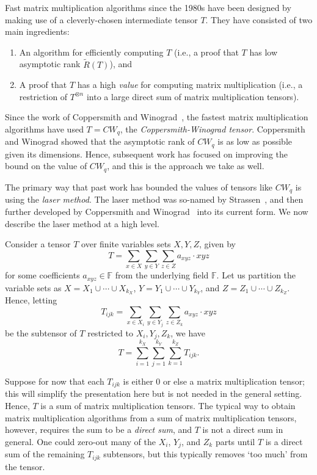 \PassOptionsToPackage{shortlabels}{enumitem}\documentclass[10pt,a4paper]{article}
\newcommand{\F}{\mathbb{F}}
\begin{document}
Fast matrix multiplication algorithms since the 1980s have been designed by making use of a cleverly-chosen intermediate tensor $T$. They have consisted of two main ingredients:
\begin{enumerate}
    \item An algorithm for efficiently computing $T$ (i.e., a proof that $T$ has low asymptotic rank $\tilde{R}(T)$), and
    \item A proof that $T$ has a high \emph{value} for computing matrix multiplication (i.e., a restriction of $T^{\otimes n}$ into a large direct sum of matrix multiplication tensors).
\end{enumerate}
Since the work of Coppersmith and Winograd~\cite{coppersmith}, the fastest matrix multiplication algorithms have used $T=CW_q$, the \emph{Coppersmith-Winograd tensor}. Coppersmith and Winograd showed that the asymptotic rank of $CW_q$ is as low as possible given its dimensions. Hence, subsequent work has focused on improving the bound on the value of $CW_q$, and this is the approach we take as well.

The primary way that past work has bounded the values of tensors like $CW_q$ is using the \emph{laser method}. The laser method was so-named by Strassen~\cite{strassenlaser1}, and then further developed by Coppersmith and Winograd~\cite{coppersmith} into its current form. We now describe the laser method at a high level.

Consider a tensor $T$ over finite variables sets $X,Y,Z$, given by $$T = \sum_{x \in X} \sum_{y \in Y} \sum_{z \in Z} a_{xyz} \cdot x y z$$ for some coefficients $a_{xyz} \in \F$ from the underlying field $\F$. Let us partition the variable sets as $X = X_1 \cup \cdots \cup X_{k_X}$, $Y = Y_1 \cup \cdots \cup Y_{k_Y}$, and $Z = Z_1 \cup \cdots \cup Z_{k_Z}$. Hence, letting $$T_{ijk} = \sum_{x \in X_i} \sum_{y \in Y_j} \sum_{z \in Z_k} a_{xyz} \cdot x y z$$ be the subtensor of $T$ restricted to $X_i,Y_j,Z_k$, we have $$T = \sum_{i=1}^{k_X} \sum_{j=1}^{k_Y} \sum_{k=1}^{k_Z} T_{ijk}.$$

Suppose for now that each $T_{ijk}$ is either $0$ or else a matrix multiplication tensor; this will simplify the presentation here but is not needed in the general setting. Hence, $T$ is a sum of matrix multiplication tensors. The typical way to obtain matrix multiplication algorithms from a sum of matrix multiplication tensors, however, requires the sum to be a {\em direct sum}, and $T$ is not a direct sum in general.
One could zero-out many of the $X_i$, $Y_j$, and $Z_k$ parts until $T$ is a direct sum of the remaining $T_{ijk}$ subtensors, but this typically removes `too much' from the tensor. 
\end{document}
